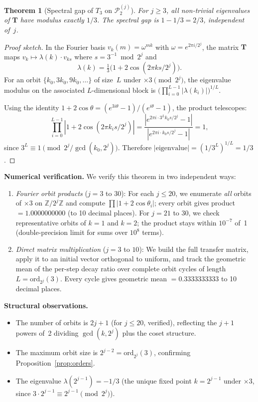 \documentclass[11pt,a4paper]{article}
\newtheorem{theorem}{Theorem}
\begin{document}
\begin{theorem}[Spectral gap of $T_3$ on $\mathcal{P}_2^{(j)}$]
\label{thm:spectral}
For $j \geq 3$, all non-trivial eigenvalues of $\mathbf{T}$ have
modulus exactly $1/3$.  The spectral gap is $1 - 1/3 = 2/3$,
independent of~$j$.
\end{theorem}

\begin{proof}[Proof sketch]
In the Fourier basis $v_k(m) = \omega^{mk}$ with $\omega = e^{2\pi i/2^j}$,
the matrix $\mathbf{T}$ maps $v_k \mapsto \lambda(k) \cdot v_{ks}$ where
$s = 3^{-1} \bmod 2^j$ and
\[
\lambda(k) = \tfrac{1}{3}\bigl(1 + 2\cos(2\pi ks / 2^j)\bigr).
\]
For an orbit $\{k_0, 3k_0, 9k_0, \ldots\}$ of size~$L$ under $\times 3 \pmod{2^j}$,
the eigenvalue modulus on the associated $L$-dimensional block is
$\bigl(\prod_{i=0}^{L-1} |\lambda(k_i)|\bigr)^{1/L}$.

Using the identity $1 + 2\cos\theta = (e^{3i\theta} - 1)/(e^{i\theta} - 1)$,
the product telescopes:
\[
\prod_{i=0}^{L-1} |1 + 2\cos(2\pi k_i s / 2^j)|
= \frac{|e^{2\pi i \cdot 3^L k_0 s / 2^j} - 1|}{|e^{2\pi i \cdot k_0 s / 2^j} - 1|}
= 1,
\]
since $3^L \equiv 1 \pmod{2^j / \gcd(k_0, 2^j)}$.
Therefore $|\text{eigenvalue}| = (1/3^L)^{1/L} = 1/3$.
\end{proof}

\textbf{Numerical verification.}
We verify this theorem in two independent ways:

\begin{enumerate}
\item \emph{Fourier orbit products} ($j = 3$ to $30$):
  For each $j \leq 20$, we enumerate \emph{all} orbits of $\times 3$ on
  $\mathbb{Z}/2^j\mathbb{Z}$ and compute $\prod |1 + 2\cos\theta_i|$;
  every orbit gives product~$= 1.0000000000$ (to 10 decimal places).
  For $j = 21$ to $30$, we check representative orbits of $k = 1$ and
  $k = 2$; the product stays within $10^{-7}$ of~1 (double-precision limit
  for sums over $10^8$ terms).

\item \emph{Direct matrix multiplication} ($j = 3$ to $10$):
  We build the full transfer matrix, apply it to an initial vector
  orthogonal to uniform, and track the geometric mean of the per-step
  decay ratio over complete orbit cycles of length $L = \text{ord}_{2^j}(3)$.
  Every cycle gives geometric mean $= 0.3333333333$ to 10 decimal places.
\end{enumerate}

\textbf{Structural observations.}
\begin{itemize}
\item The number of orbits is $2j + 1$ (for $j \leq 20$, verified),
  reflecting the $j + 1$ powers of~2 dividing $\gcd(k, 2^j)$ plus
  the coset structure.
\item The maximum orbit size is $2^{j-2} = \text{ord}_{2^j}(3)$, confirming
  Proposition~\ref{prop:orders}.
\item The eigenvalue $\lambda(2^{j-1}) = -1/3$ (the unique fixed point
  $k = 2^{j-1}$ under $\times 3$, since $3 \cdot 2^{j-1} \equiv 2^{j-1} \pmod{2^j}$).
\end{itemize}
\end{document}
